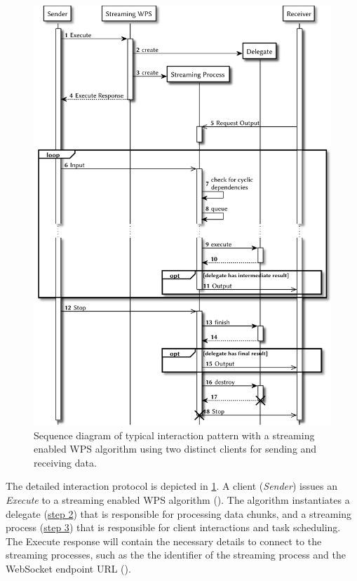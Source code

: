   \begin{figure}[!htb]
    \centering
    \includegraphics[width = 0.82253521126760565\linewidth]{figures/sequence-diagram-swps.pdf}
    \caption{\label{fig:sd:swps}Sequence diagram of typical interaction pattern with a streaming enabled WPS algorithm using two distinct clients for sending and receiving data.}
  \end{figure}

  The detailed interaction protocol is depicted in \cref{fig:sd:swps}. A client (\emph{Sender}) issues an \emph{Execute} to a streaming enabled WPS algorithm (). The algorithm instantiates a delegate (\hyperref[fig:sd:swps]{step 2}) that is responsible for processing data chunks, and a streaming process (\hyperref[fig:sd:swps]{step 3}) that is responsible for client interactions and task scheduling. The Execute response will contain the necessary details to connect to the streaming processes, such as the the identifier of the streaming process and the WebSocket endpoint URL ().

